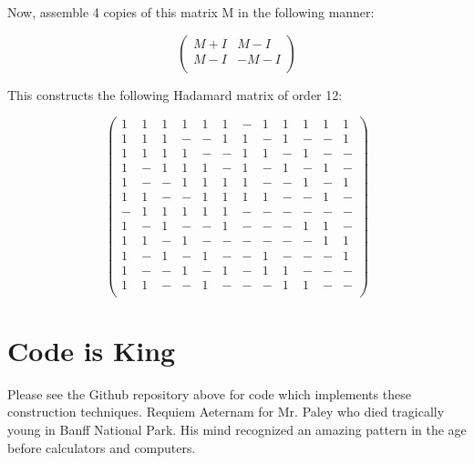 \documentclass{article}
\begin{document}
Now, assemble 4 copies of this matrix M in the following manner:

\begin{equation}
    \begin{pmatrix}
        M + I & M - I \\
        M - I & -M - I \\
    \end{pmatrix}
\end{equation}

This constructs the following Hadamard matrix of order 12:

\begin{equation}
\begin{pmatrix}
        1 & 1 & 1 & 1 & 1 & 1 & - & 1 & 1 & 1 & 1 & 1 \\
        1 & 1 & 1 & - & - & 1 & 1 & - & 1 & - & - & 1 \\
        1 & 1 & 1 & 1 & - & - & 1 & 1 & - & 1 & - & - \\
        1 & - & 1 & 1 & 1 & - & 1 & - & 1 & - & 1 & - \\
        1 & - & - & 1 & 1 & 1 & 1 & - & - & 1 & - & 1 \\
        1 & 1 & - & - & 1 & 1 & 1 & 1 & - & - & 1 & - \\
        - & 1 & 1 & 1 & 1 & 1 & - & - & - & - & - & - \\
        1 & - & 1 & - & - & 1 & - & - & - & 1 & 1 & - \\
        1 & 1 & - & 1 & - & - & - & - & - & - & 1 & 1 \\
        1 & - & 1 & - & 1 & - & - & 1 & - & - & - & 1 \\
        1 & - & - & 1 & - & 1 & - & 1 & 1 & - & - & - \\
        1 & 1 & - & - & 1 & - & - & - & 1 & 1 & - & - \\
\end{pmatrix}
\end{equation}

\section{Code is King}

Please see the Github repository above for code which implements these construction techniques.
Requiem Aeternam for Mr. Paley who died tragically young in Banff National Park.  His mind
recognized an amazing pattern in the age before calculators and computers.
\end{document}
